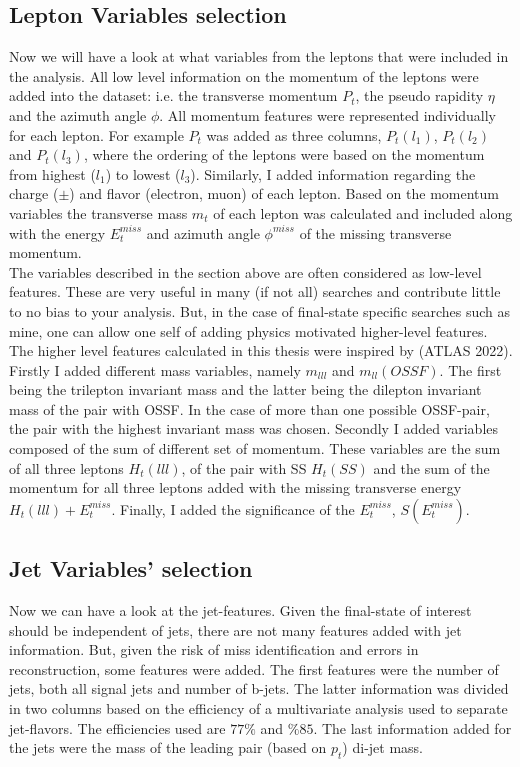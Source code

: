 \subsection{Lepton Variables selection}
Now we will have a look at what variables from the leptons that were included in the analysis. All low level information on the
momentum of the leptons were added into the dataset: i.e. the transverse momentum $P_t$, the pseudo rapidity $\eta$ and the azimuth
angle $\phi$. All momentum features were represented individually for each lepton. For example $P_t$ was added as three columns, $P_t(l_1)$,
$P_t(l_2)$ and $P_t(l_3)$, where the ordering of the leptons were based on the momentum from highest ($l_1$) to lowest ($l_3$).
Similarly, I added information regarding the charge ($\pm$) and flavor (electron, muon) of each lepton. Based on the momentum variables
the transverse mass $m_t$ of each lepton was calculated and included along with the energy $E_t^{miss}$ and azimuth angle $\phi^{miss}$ of
the missing transverse momentum.
\\
The variables described in the section above are often considered as low-level features. These are very useful in many (if not all)
searches and contribute little to no bias to your analysis. But, in the case of final-state specific searches such as mine,
one can allow one self of adding physics motivated higher-level features. The higher level features calculated in this thesis
were inspired by \cite{franchini_search_2019} (ATLAS 2022). 
\\
Firstly I added different mass variables, namely $m_{lll}$ and $m_{ll}(OSSF)$. The first being the trilepton invariant mass 
and the latter being the dilepton invariant mass of the pair with \ac{OSSF}. In the case of more than one possible OSSF-pair,
the pair with the highest invariant mass was chosen. Secondly I added variables composed of the sum of different set of momentum.
These variables are the sum of all three leptons $H_t(lll)$, of the pair with \ac{SS} $H_t(SS)$ and the sum of the momentum
for all three leptons added with the missing transverse energy $H_t(lll) + E_t^{miss}$. Finally, I added the significance of the
$E_t^{miss}$, $S(E_t^{miss})$.
\subsection{Jet Variables' selection}
Now we can have a look at the jet-features. Given the final-state of interest should be independent of jets, there are not many
features added with jet information. But, given the risk of miss identification and errors in reconstruction, some features were 
added. The first features were the number of jets, both all signal jets and number of b-jets.
The latter information was divided in two columns based on the efficiency of a multivariate analysis used to separate jet-flavors.
The efficiencies used are $77\%$ and $\%85$. The last information added for the jets were the mass of the leading pair (based on $p_t$)
di-jet mass.
